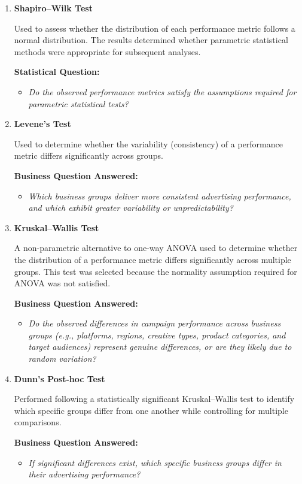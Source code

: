 \begin{enumerate}
	
	\item \textbf{Shapiro--Wilk Test}
	
	Used to assess whether the distribution of each performance metric follows a normal distribution. The results determined whether parametric statistical methods were appropriate for subsequent analyses.
	
	\textbf{Statistical Question:}
	\begin{itemize}
		\item \textit{Do the observed performance metrics satisfy the assumptions required for parametric statistical tests?}
	\end{itemize}
	
	\item \textbf{Levene's Test}
	
	Used to determine whether the variability (consistency) of a performance metric differs significantly across groups.
	
	\textbf{Business Question Answered:}
	\begin{itemize}
		\item \textit{Which business groups deliver more consistent advertising performance, and which exhibit greater variability or unpredictability?}
	\end{itemize}
	
	\item \textbf{Kruskal--Wallis Test}
	
	A non-parametric alternative to one-way ANOVA used to determine whether the distribution of a performance metric differs significantly across multiple groups. This test was selected because the normality assumption required for ANOVA was not satisfied.
	
	\textbf{Business Question Answered:}
	\begin{itemize}
		\item \textit{Do the observed differences in campaign performance across business groups (e.g., platforms, regions, creative types, product categories, and target audiences) represent genuine differences, or are they likely due to random variation?}
	\end{itemize}
	
	\item \textbf{Dunn's Post-hoc Test}
	
	Performed following a statistically significant Kruskal--Wallis test to identify which specific groups differ from one another while controlling for multiple comparisons.
	
	\textbf{Business Question Answered:}
	\begin{itemize}
		\item \textit{If significant differences exist, which specific business groups differ in their advertising performance?}
	\end{itemize}
	
\end{enumerate}

